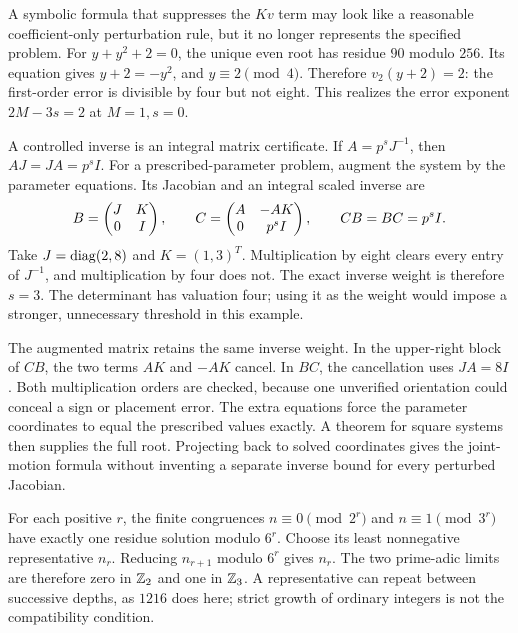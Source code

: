 A symbolic formula that suppresses the $Kv$ term may look like a reasonable coefficient-only perturbation rule, but it no longer represents the specified problem.
For $y+y^2+2=0$, the unique even root has residue $90$ modulo $256$. Its equation gives $y+2=-y^2$, and $y\equiv2\pmod4$. Therefore $v_2(y+2)=2$: the first-order error is divisible by four but not eight. This realizes the error exponent $2M-3s=2$ at $M=1,s=0$.

A controlled inverse is an integral matrix certificate. If $A=p^sJ^{-1}$, then $AJ=JA=p^sI$. For a prescribed-parameter problem, augment the system by the parameter equations. Its Jacobian and an integral scaled inverse are
\[
 B=\begin{pmatrix}J&K\\0&I\end{pmatrix},\qquad
 C=\begin{pmatrix}A&-AK\\0&p^sI\end{pmatrix},\qquad CB=BC=p^sI.
\]
Take $J=\operatorname{diag}(2,8)$ and $K=(1,3)^T$. Multiplication by eight clears every entry of $J^{-1}$, and multiplication by four does not. The exact inverse weight is therefore $s=3$. The determinant has valuation four; using it as the weight would impose a stronger, unnecessary threshold in this example.

The augmented matrix retains the same inverse weight. In the upper-right block of $CB$, the two terms $AK$ and $-AK$ cancel. In $BC$, the cancellation uses $JA=8I$. Both multiplication orders are checked, because one unverified orientation could conceal a sign or placement error.
The extra equations force the parameter coordinates to equal the prescribed values exactly. A theorem for square systems then supplies the full root. Projecting back to solved coordinates gives the joint-motion formula without inventing a separate inverse bound for every perturbed Jacobian.

For each positive $r$, the finite congruences $n\equiv0\pmod{2^r}$ and $n\equiv1\pmod{3^r}$ have exactly one residue solution modulo $6^r$. Choose its least nonnegative representative $n_r$.
Reducing $n_{r+1}$ modulo $6^r$ gives $n_r$. The two prime-adic limits are therefore zero in $\mathbb Z_2$ and one in $\mathbb Z_3$. A representative can repeat between successive depths, as $1216$ does here; strict growth of ordinary integers is not the compatibility condition.

